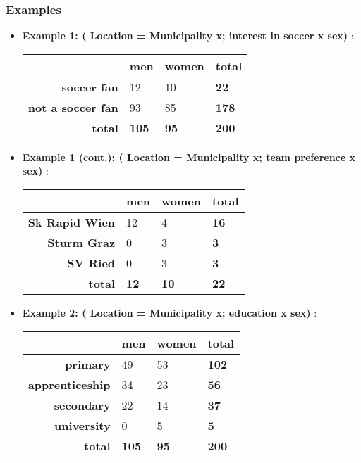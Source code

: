 \documentclass[pdfpagelabels=false, usepdftitle=false]{beamer}
\begin{document}
\begin{frame}\frametitle{Examples}
	\begin{itemize}
	    \item {\bf Example 1: ( Location = Municipality x;  interest in soccer x sex) }:
		\begin{scriptsize}
		\begin{center}
			\begin{tabular}{|r|ll|l|}
			\hline
			& {\bf men} 		& {\bf women} & {\bf total} \\ \hline
			{\bf soccer fan} 		& 12 & 10 & {\bf 22}\\
			{\bf not a soccer fan} 	& 93 & 85 & {\bf 178} \\ \hline
			{\bf total} 			& {\bf 105} & {\bf 95} & {\bf 200} \\ \hline
			\end{tabular}
		\end{center}
		\end{scriptsize} \pause
	    \item {\bf Example 1 (cont.): ( Location = Municipality x; team preference x sex) }:
		\begin{scriptsize}
		\begin{center}
			\begin{tabular}{|r|ll|l|}
			\hline
			& {\bf men} & {\bf women} & {\bf total} \\ \hline
			{\bf Sk Rapid Wien} & 12 & 4 & {\bf 16}\\
			{\bf Sturm Graz} 	& 0 & 3 & {\bf 3} \\
			{\bf SV Ried} 		& 0 & 3 &  {\bf 3} \\ \hline
			{\bf total} 		& {\bf 12} & {\bf 10} & {\bf 22} \\ \hline
			\end{tabular}
		\end{center}
		\end{scriptsize}
			    \item {\bf Example 2: ( Location = Municipality x; education x sex) }:
		\begin{scriptsize}
		\begin{center}
			\begin{tabular}{|r|ll|l|}
			\hline
			& {\bf men} & {\bf women} & {\bf total} \\ \hline
			{\bf primary} 	& 49 & 53 & {\bf 102}\\
			{\bf apprenticeship} 				& 34 & 23 & {\bf 56} \\
			{\bf secondary} 				& 22 & 14 &  {\bf 37} \\
			{\bf university} 	&  0 &  5 & {\bf 5} \\ \hline
			{\bf total} 				& {\bf 105} & {\bf 95} & {\bf 200} \\ \hline
			\end{tabular}
		\end{center}
		\end{scriptsize} \pause
	\end{itemize}
\end{frame}
\end{document}
